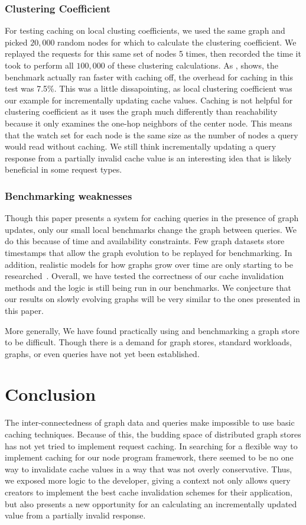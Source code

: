 \documentclass[letterpaper,twocolumn,11pt,tight]{article}
\begin{document}
\subsubsection{Clustering Coefficient}
For testing caching on local clusting coefficients, we used the same graph and picked $20,000$ random nodes for which to calculate the clustering coefficient. We replayed the requests for this same set of nodes 5 times, then recorded the time it took to perform all $100,000$ of these clustering calculations.
As , shows, the benchmark actually ran faster with caching off, the overhead for caching in this test was 7.5\%. This was a little dissapointing, as local clustering coefficient was our example for incrementally updating cache values. Caching is not helpful for clustering coefficient as it uses the graph much differently than reachability because it only examines the one-hop neighbors of the center node. This means that the watch set for each node is the same size as the number of nodes a query would read without caching.
We still think incrementally updating a query response from a partially invalid cache value is an interesting idea that is likely beneficial in some request types.

\subsubsection{Benchmarking weaknesses}
Though this paper presents a system for caching queries in the presence of graph updates, only our small local benchmarks change the graph between queries. We do this because of time and availability constraints. Few graph datasets store timestamps that allow the graph evolution to be replayed for benchmarking. In addition, realistic models for how graphs grow over time are only starting to be researched~\cite{graph_evolve}. Overall, we have tested the correctness of our cache invalidation methods and the logic is still being run in our benchmarks. We conjecture that our results on slowly evolving graphs will be very similar to the ones presented in this paper.

More generally, We have found practically using and benchmarking a graph store to be difficult. Though there is a demand for graph stores, standard workloads, graphs, or even queries have not yet been established.
\section{Conclusion}\label{sec:conclusion}
The inter-connectedness of graph data and queries make impossible to use basic caching techniques. Because of this, the budding space of distributed graph stores has not yet tried to implement request caching.
In searching for a flexible way to implement caching for our node program framework, there seemed to be no one way to invalidate cache values in a way that was not overly conservative.
Thus, we exposed more logic to the developer, giving a context not only allows query creators to implement the best cache invalidation schemes for their application, but also presents a new opportunity for an calculating an incrementally updated value from a partially invalid response.
\end{document}
